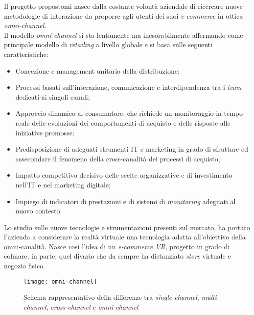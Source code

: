 Il progetto propostomi nasce dalla costante volontà aziendale di ricercare nuove metodologie di interazione da proporre agli utenti dei suoi \textit{e-commerce} in ottica \textit{omni-channel}. \\ 
Il modello \textit{omni-channel} si sta lentamente ma inesorabilmente affermando come principale modello di \textit{retailing} a livello globale e si basa sulle seguenti caratteristiche:

\begin{itemize}
	\item Concezione e management unitario della distribuzione;
	\item Processi basati sull'interazione, comunicazione e interdipendenza tra i \textit{team} dedicati ai singoli canali;
	\item Approccio dinamico al consumatore, che richiede un monitoraggio in tempo reale delle evoluzioni dei comportamenti di acquisto e delle risposte alle iniziative promosse;
	\item Predisposizione di adeguati strumenti IT e marketing in grado di sfruttare ed assecondare il fenomeno della cross-canalità dei processi di acquisto;
	\item Impatto competitivo decisivo delle scelte organizzative e di investimento nell'IT e nel marketing digitale;
	\item Impiego di indicatori di prestazioni e di sistemi di \textit{monitoring} adeguati al nuovo contesto.
\end{itemize}

Lo studio sulle nuove tecnologie e strumentazioni presenti sul mercato, ha portato l'azienda a considerare la realtà virtuale una tecnologia adatta all'obiettivo della omni-canalità. Nasce così l'idea di un \textit{e-commerce VR}, progetto in grado di colmare, in parte, quel divario che da sempre ha distanziato \textit{store} virtuale e negozio fisico.

\label{Omni-channel}
\begin{figure}[ht]
	\begin{center}
		\texttt{[image: omni-channel]}
		\caption{Schema rappresentativo della differenze tra \textit{single-channel}, \textit{multi-channel}, \textit{cross-channel} e \textit{omni-channel}}
	\end{center}
\end{figure}
\FloatBarrier

